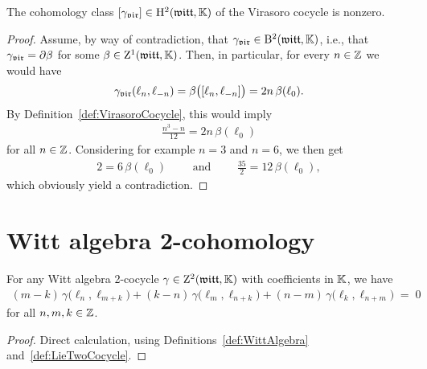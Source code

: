 \begin{lemma}
  \label{lem:VirasoroCocycleNontrivial}
  \leanok
  The cohomology class $[{\gamma}_{\mathfrak{vir}}] \in \mathrm{H}^2(\mathfrak{witt},\mathbb{K})$
  of the Virasoro cocycle is nonzero.
\end{lemma}
\begin{proof}
  \leanok
  Assume, by way of contradiction, that ${\gamma}_{\mathfrak{vir}} \in \mathrm{B}^2(\mathfrak{witt},\mathbb{K})$,
  i.e., that ${\gamma}_{\mathfrak{vir}} = \partial \beta$ for some $\beta \in \mathrm{Z}^1(\mathfrak{witt},\mathbb{K})$.
  Then, in particular, for every $n \in \mathbb{Z}$ we would have
  \begin{align*}
    {\gamma}_{\mathfrak{vir}}(\ell_n,\ell_{-n})
      = \beta \big( [\ell_n, \ell_{-n}] \big) = 2 n \, \beta ( \ell_0 ) .
  \end{align*}
  By Definition~\ref{def:VirasoroCocycle}, this would imply
  \begin{align*}
    \frac{n^3-n}{12} = 2 n \, \beta ( \ell_0 )
  \end{align*}
  for all $n \in \mathbb{Z}$. Considering for example $n=3$ and $n=6$, we then get
  \begin{align*}
    2 = 6 \, \beta (\ell_0)
    \qquad \text{ and } \qquad
    \frac{35}{2} = 12 \,  \beta (\ell_0) ,
  \end{align*}
  which obviously yield a contradiction.
\end{proof}

\section{Witt algebra 2-cohomology}

\begin{lemma}
  \label{lem:WittTwoCocycleEquation}
  \leanok
  For any Witt algebra 2-cocycle $\gamma \in \mathrm{Z}^2(\mathfrak{witt},\mathbb{K})$ with coefficients
  in $\mathbb{K}$, we have
  \begin{align*}
       (m-k) \, \gamma \big( \ell_n , \ell_{m+k} \big)
     + (k-n) \, \gamma \big( \ell_{m} , \ell_{n+k} \big)
     + (n-m) \, \gamma \big( \ell_k , \ell_{n+m} \big)
     \; = \; 0
  \end{align*}
  for all $n,m,k \in \mathbb{Z}$.
\end{lemma}
\begin{proof}
  \leanok
  Direct calculation, using Definitions~\ref{def:WittAlgebra}
  and~\ref{def:LieTwoCocycle}.
\end{proof}

